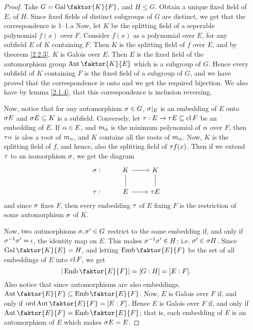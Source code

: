 \begin{proof}
    Take $G=\Gal{\faktor{K}{F}}$, and $H \leq G$. Obtain a unique fixed field of
     $E$, of $H$. Since fixed fields of distinct subgroups of $G$ are distinct,
     we get that the correspondence is 1--1.a Now, let  $K$ be the splitting
     field of a seperable polynomial  $f(x)$ over $F$. Consider $f(x)$ as a
     polynomial over $E$, for any subfield $E$ of  $K$ containing  $F$. Then
     $K$ is the splitting field of  $f$ over  $E$, and by theorem \ref{2.2.3},
     $K$ is Galois over  $E$. Then  $E$ is the fixed field of the automorphism
     group  $\Aut{\faktor{K}{E}}$ which is a subgroup of $G$. Hence every
     subfield of  $K$ containing  $F$ is the fixed field of a subgroup of  $G$,
     and we have proved that the correspondence is onto and we get the required
     bijection. We also have by lemma \ref{2.1.4}, that this correspondence is
     inclusion reversing.

     Now, notice that for any automorphism $\sigma \in G$, $\sigma|_E$ is an embedding
     of  $E$ onto $\sigma{E}$ and $\sigma{E} \subseteq K$ is a subfield. Conversely, let
     $\tau:E \xrightarrow{} \tau{E} \subseteq \operatorname{cl}{F}$ be an embedding of $E$. If $\alpha
     \in E$, and  $m_\alpha$ is the minimum polynomial of  $\alpha$ over  $F$, then
     $\tau{\alpha}$ is alos a root of $m_\alpha$, and  $K$ contains all the roots of
     $m_\alpha$. Now,  $K$ is the splitting field of  $f$, and hence, also the
     splitting field of  $\tau{f}(x)$. Then if we extend $\tau$ to an isomorphism
     $\sigma$, we get the diagram
     \[\begin{tikzcd}
            {\sigma:} & K & K \\
            {\tau:} & E & {\tau{E}}
            \arrow[from=1-2, to=1-3]
            \arrow[from=2-2, to=2-3]
            \arrow[no head, from=1-3, to=2-3]
            \arrow[no head, from=1-2, to=2-2]
      \end{tikzcd}\]
      and since $\sigma$ fixes  $F$, then every embedding $\tau$ of $E$ fixing  $F$ is
      the restriction of some automorphism  $\sigma$ of  $K$.

      Now, two autmorphisms  $\sigma,\sigma' \in G$ restrict to the same embedding if,
      and only if  $\sigma^{-1}\sigma'=\iota$, the identity map on $E$. This makes
      $\sigma^{-1}\sigma' \in H$; i.e. $\sigma' \in \sigma{H}$. Since $\Gal{\faktor{K}{E}}=H$,
      and letting $\Emb{\faktor{E}{F}}$ be the set of all embeddings of $E$ into
       $\operatorname{cl}{F}$, we get
       \begin{equation*}
           |\Emb{\faktor{E}{F}}|=[G:H]=[E:F].
       \end{equation*}
       Also notice that since automorphisms are also embeddings,
       $\Aut{\faktor{E}{F}} \subseteq \Emb{\faktor{E}{F}}$. Now, $E$ is Galois
       over  $F$ if, and only if  $\ord{\Aut{\faktor{E}{F}}}=[E:F]$. Hence $E$
       is Galois over  $F$ if, and only if
       $\Aut{\faktor{E}{F}}=\Emb{\faktor{E}{F}}$; that is, each embedding of $E$
       is an automorphism of $E$ which makes $\sigma{E}=E$.


\end{proof}
